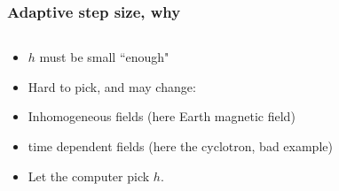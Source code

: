 \documentclass{beamer}
\begin{document}
\begin{frame}
\frametitle{Adaptive step size, why}




\begin{columns}
\begin{column}{0.5\linewidth}
\begin{itemize}
\item <1-> $h$ must be small ``enough"

\item <2-> Hard to pick, and may change:

\item <3-> Inhomogeneous fields (here Earth magnetic field)

\item <4-> time dependent fields (here the cyclotron, bad example)

\item <5-> Let the computer pick $h$.

\end{itemize}
\end{column}
\begin{column}{0.5\linewidth}


\end{column}
\end{columns}
\end{frame}
\end{document}
